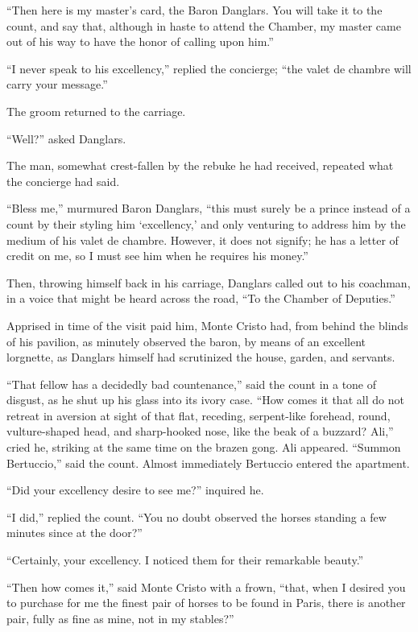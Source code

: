 “Then here is my master’s card, the Baron Danglars. You will take it to
the count, and say that, although in haste to attend the Chamber, my
master came out of his way to have the honor of calling upon him.”

“I never speak to his excellency,” replied the concierge; “the valet de
chambre will carry your message.”

The groom returned to the carriage.

“Well?” asked Danglars.

The man, somewhat crest-fallen by the rebuke he had received, repeated
what the concierge had said.

“Bless me,” murmured Baron Danglars, “this must surely be a prince
instead of a count by their styling him ‘excellency,’ and only
venturing to address him by the medium of his valet de chambre.
However, it does not signify; he has a letter of credit on me, so I
must see him when he requires his money.”

Then, throwing himself back in his carriage, Danglars called out to his
coachman, in a voice that might be heard across the road, “To the
Chamber of Deputies.”

Apprised in time of the visit paid him, Monte Cristo had, from behind
the blinds of his pavilion, as minutely observed the baron, by means of
an excellent lorgnette, as Danglars himself had scrutinized the house,
garden, and servants.

“That fellow has a decidedly bad countenance,” said the count in a tone
of disgust, as he shut up his glass into its ivory case. “How comes it
that all do not retreat in aversion at sight of that flat, receding,
serpent-like forehead, round, vulture-shaped head, and sharp-hooked
nose, like the beak of a buzzard? Ali,” cried he, striking at the same
time on the brazen gong. Ali appeared. “Summon Bertuccio,” said the
count. Almost immediately Bertuccio entered the apartment.

“Did your excellency desire to see me?” inquired he.

“I did,” replied the count. “You no doubt observed the horses standing
a few minutes since at the door?”

“Certainly, your excellency. I noticed them for their remarkable
beauty.”

“Then how comes it,” said Monte Cristo with a frown, “that, when I
desired you to purchase for me the finest pair of horses to be found in
Paris, there is another pair, fully as fine as mine, not in my
stables?”

